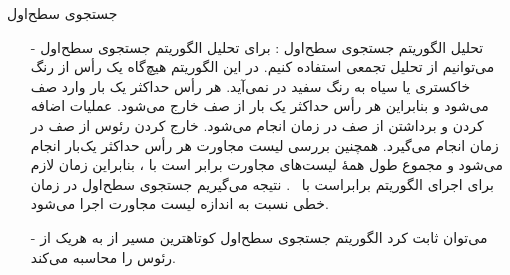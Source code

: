 \begin{frame}{‌جستجوی سطح‌اول}
\begin{itemize}\itemr
\item[-]
تحلیل الگوریتم جستجوی سطح‌اول : برای تحلیل الگوریتم جستجوی سطح‌اول می‌توانیم از تحلیل تجمعی استفاده کنیم. در این الگوریتم هیچ‌گاه یک رأس از رنگ خاکستری یا سیاه به رنگ سفید در نمی‌آید. هر رأس حداکثر یک بار وارد صف می‌شود و بنابراین هر رأس حداکثر یک بار از صف خارج می‌شود. عملیات اضافه کردن و برداشتن از صف در زمان
انجام می‌شود.
خارج کردن رئوس از صف در زمان
انجام می‌گیرد.
همچنین بررسی لیست مجاورت هر رأس حداکثر یک‌بار انجام می‌شود و مجموع طول همهٔ لیست‌های مجاورت برابر است با
، بنابراین زمان لازم برای اجرای الگوریتم برابراست با
~.
نتیجه می‌گیریم جستجوی سطح‌اول در زمان خطی نسبت به اندازه لیست مجاورت اجرا می‌شود.
\item[-]
می‌توان ثابت کرد الگوریتم جستجوی سطح‌اول کوتاهترین مسیر از
به هریک از رئوس را محاسبه می‌کند.
\end{itemize}
\end{frame}

